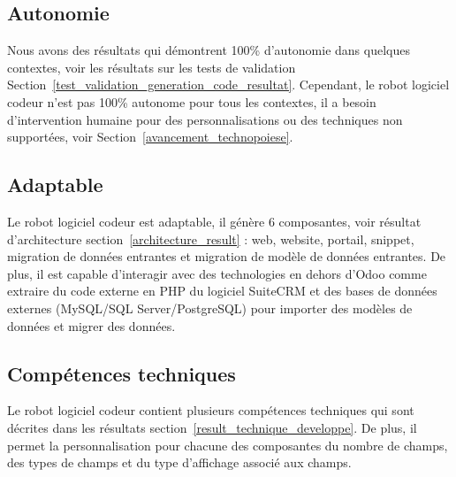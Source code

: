 \subsection{Autonomie}
Nous avons des résultats qui démontrent 100\% d'autonomie dans quelques contextes, voir les résultats sur les tests de validation Section~\ref{test_validation_generation_code_resultat}. Cependant, le robot logiciel codeur n'est pas 100\% autonome pour tous les contextes, il a besoin d'intervention humaine pour des personnalisations ou des techniques non supportées, voir Section~\ref{avancement_technopoiese}.


\subsection{Adaptable}
Le robot logiciel codeur est adaptable, il génère 6 composantes, voir résultat d'architecture section~\ref{architecture_result} : web, website, portail, snippet, migration de données entrantes et migration de modèle de données entrantes. De plus, il est capable d'interagir avec des technologies en dehors d'Odoo comme extraire du code externe en PHP du logiciel SuiteCRM et des bases de données externes (MySQL/SQL Server/PostgreSQL) pour importer des modèles de données et migrer des données.


\subsection{Compétences techniques}
Le robot logiciel codeur contient plusieurs compétences techniques qui sont décrites dans les résultats section~\ref{result_technique_developpe}. De plus, il permet la personnalisation pour chacune des composantes du nombre de champs, des types de champs et du type d'affichage associé aux champs.


